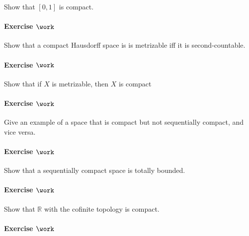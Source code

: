 Show that \([0, 1]\) is compact.

\hypertarget{exercise-work-25}{%
\paragraph{\texorpdfstring{Exercise
\(\work\)}{Exercise \textbackslash work}}\label{exercise-work-25}}

Show that a compact Hausdorff space is is metrizable iff it is
second-countable.

\hypertarget{exercise-work-26}{%
\paragraph{\texorpdfstring{Exercise
\(\work\)}{Exercise \textbackslash work}}\label{exercise-work-26}}

Show that if \(X\) is metrizable, then \(X\) is compact

\hypertarget{exercise-work-27}{%
\paragraph{\texorpdfstring{Exercise
\(\work\)}{Exercise \textbackslash work}}\label{exercise-work-27}}

Give an example of a space that is compact but not sequentially compact,
and vice versa.

\hypertarget{exercise-work-28}{%
\paragraph{\texorpdfstring{Exercise
\(\work\)}{Exercise \textbackslash work}}\label{exercise-work-28}}

Show that a sequentially compact space is totally bounded.

\hypertarget{exercise-work-29}{%
\paragraph{\texorpdfstring{Exercise
\(\work\)}{Exercise \textbackslash work}}\label{exercise-work-29}}

Show that \({\mathbb{R}}\) with the cofinite topology is compact.

\hypertarget{exercise-work-30}{%
\paragraph{\texorpdfstring{Exercise
\(\work\)}{Exercise \textbackslash work}}\label{exercise-work-30}}

